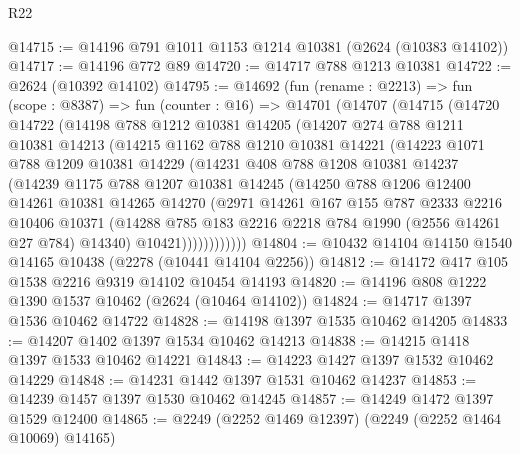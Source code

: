 \begin{lexlean}{R22}
\begin{coremodule}
@14715 := @14196 @791 @1011 @1153 @1214 @10381 (@2624 (@10383 @14102))
@14717 := @14196 @772 @89
@14720 := @14717 @788 @1213 @10381
@14722 := @2624 (@10392 @14102)
@14795 := @14692
    (fun (rename : @2213) =>
    fun (scope : @8387) =>
    fun (counter : @16) =>
    @14701
      (@14707
        (@14715
          (@14720
            @14722
            (@14198
              @788
              @1212
              @10381
              @14205
              (@14207
                @274
                @788
                @1211
                @10381
                @14213
                (@14215
                  @1162
                  @788
                  @1210
                  @10381
                  @14221
                  (@14223
                    @1071
                    @788
                    @1209
                    @10381
                    @14229
                    (@14231
                      @408
                      @788
                      @1208
                      @10381
                      @14237
                      (@14239
                        @1175
                        @788
                        @1207
                        @10381
                        @14245
                        (@14250
                          @788
                          @1206
                          @12400
                          @14261
                          @10381
                          @14265
                          @14270
                          (@2971
                            @14261
                            @167
                            @155
                            @787
                            @2333
                            @2216
                            @10406
                            @10371
                            (@14288 @785 @183 @2216 @2218 @784 @1990 (@2556 @14261 @27 @784) @14340)
                            @10421))))))))))))
@14804 := @10432 @14104 @14150 @1540 @14165 @10438 (@2278 (@10441 @14104 @2256))
@14812 := @14172 @417 @105 @1538 @2216 @9319 @14102 @10454 @14193
@14820 := @14196 @808 @1222 @1390 @1537 @10462 (@2624 (@10464 @14102))
@14824 := @14717 @1397 @1536 @10462 @14722
@14828 := @14198 @1397 @1535 @10462 @14205
@14833 := @14207 @1402 @1397 @1534 @10462 @14213
@14838 := @14215 @1418 @1397 @1533 @10462 @14221
@14843 := @14223 @1427 @1397 @1532 @10462 @14229
@14848 := @14231 @1442 @1397 @1531 @10462 @14237
@14853 := @14239 @1457 @1397 @1530 @10462 @14245
@14857 := @14249 @1472 @1397 @1529 @12400
@14865 := @2249 (@2252 @1469 @12397) (@2249 (@2252 @1464 @10069) @14165)

\end{coremodule}
\end{lexlean}
